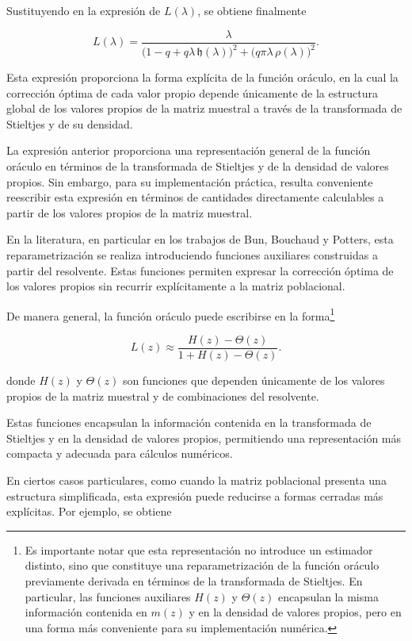 \documentclass[letterpaper,12pt,oneside]{book}
\begin{document}
Sustituyendo en la expresión de $L(\lambda)$, se obtiene finalmente

\[
L(\lambda)
=
\frac{\lambda}
{\bigl(1-q+q\lambda\,\mathfrak{h}(\lambda)\bigr)^2
+
\bigl(q\pi\lambda\,\rho(\lambda)\bigr)^2 }.
\]

Esta expresión proporciona la forma explícita de la función oráculo, en la cual la corrección óptima de cada valor propio depende únicamente de la estructura global de los valores propios de la matriz muestral a través de la transformada de Stieltjes y de su densidad.

La expresión anterior proporciona una representación general de la función oráculo en términos de la transformada de Stieltjes y de la densidad de valores propios. Sin embargo, para su implementación práctica, resulta conveniente reescribir esta expresión en términos de cantidades directamente calculables a partir de los valores propios de la matriz muestral.

En la literatura, en particular en los trabajos de Bun, Bouchaud y Potters, esta reparametrización se realiza introduciendo funciones auxiliares construidas a partir del resolvente. Estas funciones permiten expresar la corrección óptima de los valores propios sin recurrir explícitamente a la matriz poblacional.

De manera general, la función oráculo puede escribirse en la forma\footnote{Es importante notar que esta representación no introduce un estimador distinto, sino que constituye una reparametrización de la función oráculo previamente derivada en términos de la transformada de Stieltjes. En particular, las funciones auxiliares $H(z)$ y $\Theta(z)$ encapsulan la misma información contenida en $m(z)$ y en la densidad de valores propios, pero en una forma más conveniente para su implementación numérica.}

\[
L(z)\approx
\frac{H(z)-\Theta(z)}{1+H(z)-\Theta(z)}.
\]

donde $H(z)$ y $\Theta(z)$ son funciones que dependen únicamente de los valores propios de la matriz muestral y de combinaciones del resolvente.

Estas funciones encapsulan la información contenida en la transformada de Stieltjes y en la densidad de valores propios, permitiendo una representación más compacta y adecuada para cálculos numéricos.

En ciertos casos particulares, como cuando la matriz poblacional presenta una estructura simplificada, esta expresión puede reducirse a formas cerradas más explícitas. Por ejemplo, se obtiene
\end{document}
